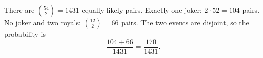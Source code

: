 There are $\binom{54}2=1431$ equally likely pairs. Exactly one joker: $2\cdot52=104$ pairs. No joker and two royals: $\binom{12}2=66$ pairs. The two events are disjoint, so the probability is
\[\dfrac{104+66}{1431}=\boxed{\dfrac{170}{1431}}.\]
